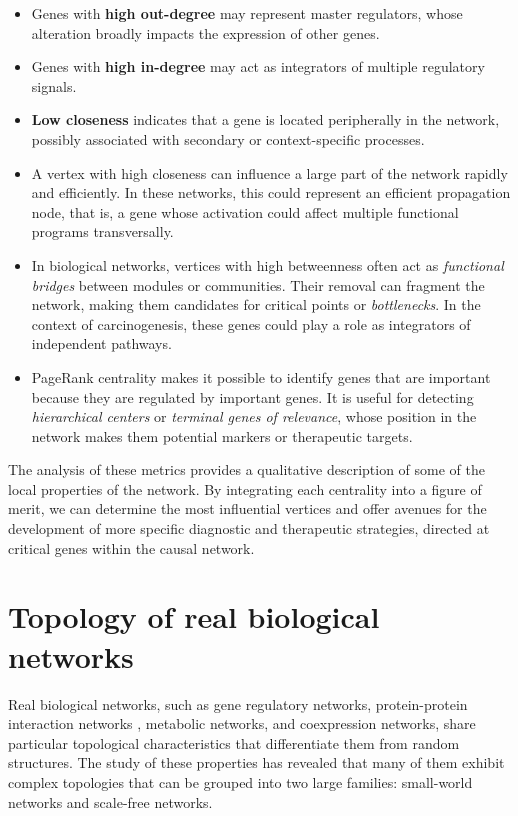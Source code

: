 \documentclass[12pt,a4paper]{report}
\begin{document}
\begin{itemize}
    \item Genes with \textbf{high out-degree} may represent master regulators, whose alteration broadly impacts the expression of other genes.
    \item Genes with \textbf{high in-degree} may act as integrators of multiple regulatory signals.
    \item \textbf{Low closeness} indicates that a gene is located peripherally in the network, possibly associated with secondary or context-specific processes.
     \item A vertex with high closeness can influence a large part of the network rapidly and efficiently. In these networks, this could represent an efficient propagation node, that is, a gene whose activation could affect multiple functional programs transversally.
     \item In biological networks, vertices with high betweenness often act as \textit{functional bridges} between modules or communities. Their removal can fragment the network, making them candidates for critical points or \textit{bottlenecks}. In the context of carcinogenesis, these genes could play a role as integrators of independent pathways.
      \item PageRank centrality makes it possible to identify genes that are important because they are regulated by important genes. It is useful for detecting \textit{hierarchical centers} or \textit{terminal genes of relevance}, whose position in the network makes them potential markers or therapeutic targets.
\end{itemize}


The analysis of these metrics provides a qualitative description of some of the local properties of the network. By integrating each centrality into a figure of merit, we can determine the most influential vertices and offer avenues for the development of more specific diagnostic and therapeutic strategies, directed at critical genes within the causal network.

\section{Topology of real biological networks}

Real biological networks, such as gene regulatory networks, protein-protein interaction networks \cite{ppi}, metabolic networks, and coexpression networks\cite{metabolic}, share particular topological characteristics that differentiate them from random structures. The study of these properties has revealed that many of them exhibit complex topologies that can be grouped into two large families: small-world networks\cite{small} and scale-free networks\cite{scale}.
\end{document}
